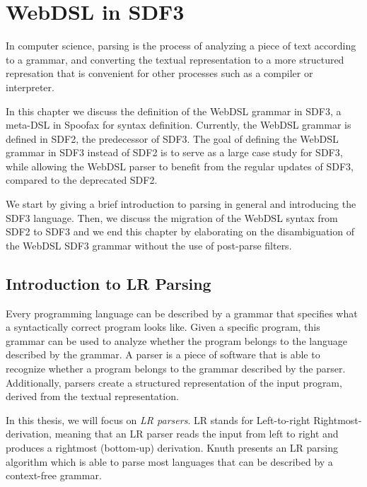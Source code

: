 
\chapter{\label{chap:sdf3}WebDSL in SDF3}

  In computer science, parsing is the process of analyzing a piece of text according to a grammar, and converting the textual representation to a more structured represation that is convenient for other processes such as a compiler or interpreter.

  In this chapter we discuss the definition of the WebDSL grammar in SDF3, a meta-DSL in Spoofax for syntax definition. Currently, the WebDSL grammar is defined in SDF2, the predecessor of SDF3. The goal of defining the WebDSL grammar in SDF3 instead of SDF2 is to serve as a large case study for SDF3, while allowing the WebDSL parser to benefit from the regular updates of SDF3, compared to the deprecated SDF2.

  We start by giving a brief introduction to parsing in general and introducing the SDF3 language. Then, we discuss the migration of the WebDSL syntax from SDF2 to SDF3 and we end this chapter by elaborating on the disambiguation of the WebDSL SDF3 grammar without the use of post-parse filters.

  \section{\label{sec:parsing}Introduction to LR Parsing}

    Every programming language can be described by a grammar that specifies what a syntactically correct program looks like. Given a specific program, this grammar can be used to analyze whether the program belongs to the language described by the grammar. A parser is a piece of software that is able to recognize whether a program belongs to the grammar described by the parser. Additionally, parsers create a structured representation of the input program, derived from the textual representation.
    
    In this thesis, we will focus on \textit{LR parsers}. LR stands for Left-to-right Rightmost-derivation, meaning that an LR parser reads the input from left to right and produces a rightmost (bottom-up) derivation. Knuth \citeyear{knuth1965translation} presents an LR parsing algorithm which is able to parse most languages that can be described by a context-free grammar.

